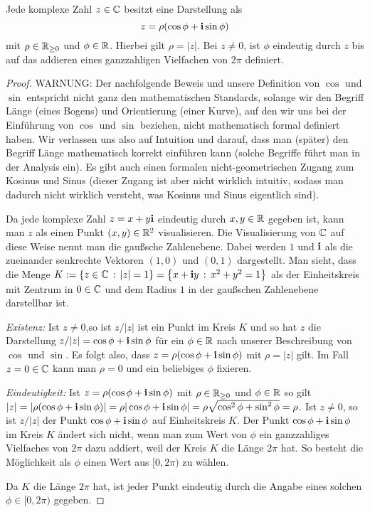 \begin{thm} \label{thm:z:betr:arg}
	Jede komplexe Zahl $z \in \mathbb{C}$ besitzt eine Darstellung als 
	\[
		z = \rho ( \cos \phi + \mathbf{i} \sin \phi )
	\]
	mit $\rho \in \mathbb{R}_{\ge 0}$ und $\phi \in \mathbb{R}$. Hierbei gilt $\rho = |z|$. Bei $z \ne 0$, ist $\phi$ eindeutig durch $z$ bis auf das addieren eines ganzzahligen Vielfachen von $2 \pi$ definiert. 
\end{thm}

\begin{proof}  
	{\color{red} WARNUNG:} Der nachfolgende Beweis und unsere Definition von $\cos$ und $\sin$ entspricht nicht ganz den mathematischen Standards, solange wir den Begriff  Länge (eines Bogens) und Orientierung (einer Kurve), auf den  wir uns bei der Einführung von $\cos$ und $\sin$ beziehen, nicht mathematisch formal definiert haben. Wir verlassen uns also auf Intuition und darauf, dass man (später) den Begriff Länge mathematisch korrekt einführen kann (solche Begriffe führt man in der Analysis ein). Es gibt auch einen formalen nicht-geometrischen Zugang zum Kosinus und Sinus (dieser Zugang ist aber nicht wirklich intuitiv, sodass man dadurch nicht wirklich versteht, was Kosinus und Sinus eigentlich sind). 
	
	Da jede komplexe Zahl $z = x + y \mathbf{i}$ eindeutig durch $x, y \in \mathbb{R}$ gegeben ist, kann man $z$ als einen Punkt $(x,y) \in \mathbb{R}^2$ visualisieren. Die Visualisierung von $\mathbb{C}$ auf diese Weise nennt man die gaußsche Zahlenebene. Dabei werden $1$ und $\mathbf{i}$ als die zueinander senkrechte Vektoren $(1,0)$ und $(0,1)$ dargestellt. Man sieht, dass die Menge $K := \left\{ z \in \mathbb{C} \,:\, |z|=1 \right\} = \left\{  x+ \mathbf{i} y \,:\, x^2 + y^2 =1 \right\}$ als  der Einheitskreis mit Zentrum in $0 \in \mathbb{C}$ und dem Radius $1$ in der gaußschen Zahlenebene darstellbar ist. 
	
	\emph{Existenz:} Ist $z \ne 0$,so ist $z / |z|$ ist ein Punkt im Kreis $K$ und so hat $z$ die Darstellung $ z / |z| = \cos \phi + \mathbf{i} \sin \phi$ für ein $\phi \in \mathbb{R}$ nach unserer Beschreibung von $\cos$ und $\sin$. Es folgt also, dass $z = \rho ( \cos \phi + \mathbf{i} \sin \phi)$ mit $\rho = |z|$ gilt. Im Fall $z= 0 \in \mathbb{C}$ kann man $\rho =0$ und ein beliebiges $\phi$ fixieren. 
	
	\emph{Eindeutigkeit:} Ist $z = \rho (\cos \phi + \mathbf{i} \sin \phi)$ mit $\rho \in \mathbb{R}_{\ge 0}$ und $\phi \in \mathbb{R}$ so gilt $|z| = | \rho (\cos \phi + \mathbf{i} \sin \phi) | = \rho | \cos \phi + \mathbf{i} \sin \phi| = \rho \sqrt{ \cos^2 \phi + \sin^2\phi } = \rho$. Ist $z \ne 0$, so ist 
	$ z/ |z|$ der Punkt $\cos \phi + \mathbf{i} \sin \phi$ auf Einheitskreis $K$. Der Punkt $\cos \phi + \mathbf{i} \sin \phi$ im Kreis $K$ ändert sich nicht, wenn man zum Wert von $\phi$  ein ganzzahliges Vielfaches von $2 \pi$ dazu addiert, weil der Kreis $K$ die Länge $2\pi$ hat. So besteht die Möglichkeit als $\phi$ einen Wert aus $[0,2 \pi)$ zu wählen. 
	
	 Da $K$ die Länge $2\pi$ hat, ist jeder Punkt eindeutig durch die Angabe eines solchen $\phi \in [0,2 \pi)$ gegeben. 
\end{proof} 

